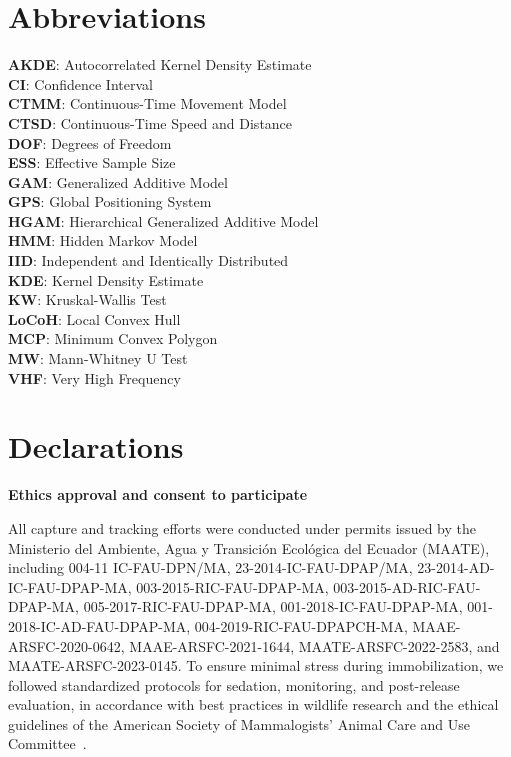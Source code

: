\documentclass[lineno,referee,pdflatex,sn-vancouver-num]{sn-jnl}%
\theoremstyle{thmstyleone}%
\theoremstyle{thmstyletwo}%
\theoremstyle{thmstylethree}%
\begin{document}
\section*{Abbreviations}

\noindent
\textbf{AKDE}: Autocorrelated Kernel Density Estimate \\
\textbf{CI}: Confidence Interval \\
\textbf{CTMM}: Continuous-Time Movement Model \\
\textbf{CTSD}: Continuous-Time Speed and Distance \\
\textbf{DOF}: Degrees of Freedom \\
\textbf{ESS}: Effective Sample Size \\
\textbf{GAM}: Generalized Additive Model \\
\textbf{GPS}: Global Positioning System \\
\textbf{HGAM}: Hierarchical Generalized Additive Model \\
\textbf{HMM}: Hidden Markov Model \\
\textbf{IID}: Independent and Identically Distributed \\
\textbf{KDE}: Kernel Density Estimate \\
\textbf{KW}: Kruskal-Wallis Test \\
\textbf{LoCoH}: Local Convex Hull \\
\textbf{MCP}: Minimum Convex Polygon \\
\textbf{MW}: Mann-Whitney U Test \\
\textbf{VHF}: Very High Frequency

\backmatter

\section*{Declarations}

\noindent\textbf{Ethics approval and consent to participate}

All capture and tracking efforts were conducted under permits issued by the Ministerio del Ambiente, Agua y Transici\'{o}n Ecol\'{o}gica del Ecuador (MAATE), including 004-11 IC-FAU-DPN/MA, 23-2014-IC-FAU-DPAP/MA, 23-2014-AD-IC-FAU-DPAP-MA, 003-2015-RIC-FAU-DPAP-MA, 003-2015-AD-RIC-FAU-DPAP-MA, 005-2017-RIC-FAU-DPAP-MA, 001-2018-IC-FAU-DPAP-MA, 001-2018-IC-AD-FAU-DPAP-MA, 004-2019-RIC-FAU-DPAPCH-MA, MAAE-ARSFC-2020-0642, MAAE-ARSFC-2021-1644, MAATE-ARSFC-2022-2583, and MAATE-ARSFC-2023-0145. To ensure minimal stress during immobilization, we followed standardized protocols for sedation, monitoring, and post-release evaluation, in accordance with best practices in wildlife research and the ethical guidelines of the American Society of Mammalogists' Animal Care and Use Committee~\cite{sikes2016GuidelinesAmerican2016}.
\end{document}
